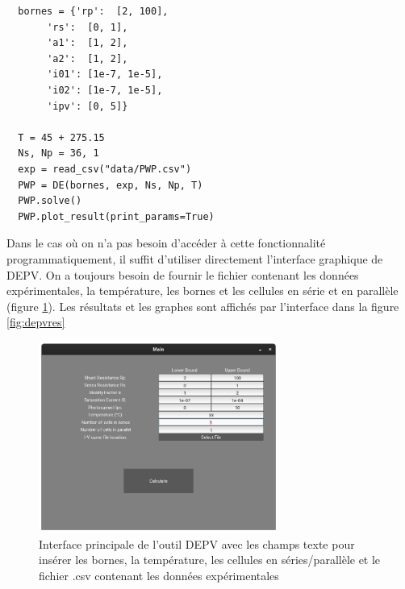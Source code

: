 \begin{verbatim}
  bornes = {'rp':  [2, 100],
       'rs':  [0, 1],
       'a1':  [1, 2],
       'a2':  [1, 2],
       'i01': [1e-7, 1e-5],
       'i02': [1e-7, 1e-5],
       'ipv': [0, 5]}
       
  T = 45 + 275.15
  Ns, Np = 36, 1
  exp = read_csv("data/PWP.csv")
  PWP = DE(bornes, exp, Ns, Np, T)
  PWP.solve()
  PWP.plot_result(print_params=True)
\end{verbatim}
Dans le cas où on n'a pas besoin d'accéder à cette fonctionnalité programmatiquement, il suffit d'utiliser directement l'interface graphique de DEPV. On a toujours besoin de fournir le fichier contenant les données expérimentales, la température, les bornes et les cellules en série et en parallèle (figure \ref{fig:depvmain}). Les résultats et les graphes sont affichés par l'interface dans la figure \ref{fig:depvres}

\begin{figure}[H]
  \begin{center}
    \includegraphics[width=0.7\textwidth]{resources/paramwindow.png}
    \caption{Interface principale de l'outil DEPV avec les champs texte pour insérer les bornes, la température, les cellules en séries/parallèle et le fichier .csv contenant les données expérimentales}
    \label{fig:depvmain}
  \end{center}
\end{figure}

